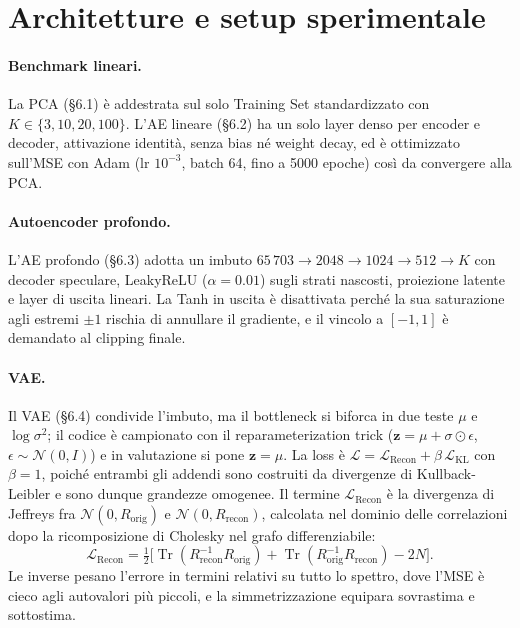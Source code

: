 \section{Architetture e setup sperimentale}

\paragraph{Benchmark lineari.} La PCA (\S6.1) è addestrata sul solo Training Set standardizzato con $K \in \{3, 10, 20, 100\}$. L'AE lineare (\S6.2) ha un solo layer denso per encoder e decoder, attivazione identità, senza bias né weight decay, ed è ottimizzato sull'MSE con Adam (lr $10^{-3}$, batch 64, fino a 5000 epoche) così da convergere alla PCA.

\paragraph{Autoencoder profondo.} L'AE profondo (\S6.3) adotta un imbuto $65\,703 \to 2048 \to 1024 \to 512 \to K$ con decoder speculare, LeakyReLU ($\alpha = 0.01$) sugli strati nascosti, proiezione latente e layer di uscita lineari. La Tanh in uscita è disattivata perché la sua saturazione agli estremi $\pm 1$ rischia di annullare il gradiente, e il vincolo a $[-1, 1]$ è demandato al clipping finale.

\paragraph{VAE.} Il VAE (\S6.4) condivide l'imbuto, ma il bottleneck si biforca in due teste $\mu$ e $\log \sigma^2$; il codice è campionato con il reparameterization trick ($\mathbf{z} = \mu + \sigma \odot \epsilon$, $\epsilon \sim \mathcal{N}(0, I)$) e in valutazione si pone $\mathbf{z} = \mu$. La loss è $\mathcal{L} = \mathcal{L}_{\text{Recon}} + \beta\,\mathcal{L}_{\text{KL}}$ con $\beta = 1$, poiché entrambi gli addendi sono costruiti da divergenze di Kullback-Leibler e sono dunque grandezze omogenee. Il termine $\mathcal{L}_{\text{Recon}}$ è la divergenza di Jeffreys fra $\mathcal{N}(0, R_{\text{orig}})$ e $\mathcal{N}(0, R_{\text{recon}})$, calcolata nel dominio delle correlazioni dopo la ricomposizione di Cholesky nel grafo differenziabile:
\[
\mathcal{L}_{\text{Recon}} = \tfrac{1}{2}\big[\operatorname{Tr}(R_{\text{recon}}^{-1} R_{\text{orig}}) + \operatorname{Tr}(R_{\text{orig}}^{-1} R_{\text{recon}}) - 2N\big].
\]
Le inverse pesano l'errore in termini relativi su tutto lo spettro, dove l'MSE è cieco agli autovalori più piccoli, e la simmetrizzazione equipara sovrastima e sottostima.

